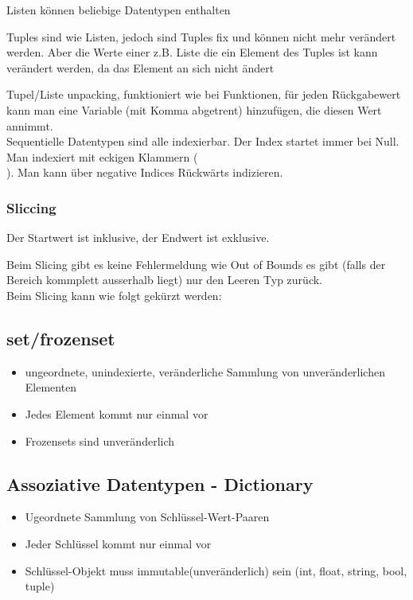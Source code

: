 	
	Listen können beliebige Datentypen enthalten
	
	Tuples sind wie Listen, jedoch sind Tuples fix und können nicht mehr verändert werden. Aber die Werte
	einer z.B. Liste die ein Element des Tuples ist kann verändert werden, da das Element an sich
	nicht ändert
	
	Tupel/Liste unpacking, funktioniert wie bei Funktionen, für jeden Rückgabewert kann man eine Variable
	(mit Komma abgetrent) hinzufügen, die diesen Wert annimmt.\\
	Sequentielle Datentypen sind alle indexierbar. 
	Der Index startet immer bei Null. Man indexiert mit eckigen Klammern (\[\]). Man kann über negative Indices Rückwärts indizieren.
	\subsubsection{Sliccing}
	Der Startwert ist inklusive, der Endwert ist exklusive.
	
	
	Beim Slicing gibt es keine Fehlermeldung wie Out of Bounds es gibt (falls der Bereich kommplett ausserhalb liegt)
	nur den Leeren Typ zurück.\\
	Beim Slicing kann wie folgt gekürzt werden:
	
	
\subsection{set/frozenset}
\begin{itemize}
\item ungeordnete, unindexierte, veränderliche Sammlung von unveränderlichen Elementen
\item Jedes Element kommt nur einmal vor
\item Frozensets sind unveränderlich 
\end{itemize}


\subsection{Assoziative Datentypen - Dictionary}

\begin{itemize}
\item Ugeordnete Sammlung von Schlüssel-Wert-Paaren
\item Jeder Schlüssel kommt nur einmal vor
\item Schlüssel-Objekt muss immutable(unveränderlich) sein (int, float, string, bool, tuple)
\end{itemize}